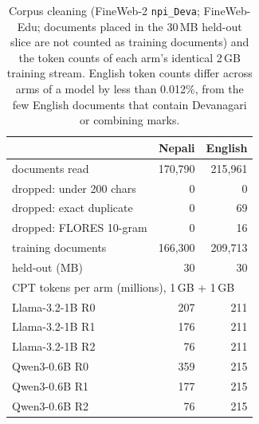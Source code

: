 \begin{table}[t]
\centering\small
\setlength{\tabcolsep}{3.5pt}
\begin{tabular}{lrr}
\toprule
& Nepali & English \\
\midrule
documents read & 170,790 & 215,961 \\
dropped: under 200 chars & 0 & 0 \\
dropped: exact duplicate & 0 & 69 \\
dropped: FLORES 10-gram & 0 & 16 \\
training documents & 166,300 & 209,713 \\
held-out (MB) & 30 & 30 \\
\midrule
\multicolumn{3}{l}{CPT tokens per arm (millions), 1\,GB + 1\,GB}\\
Llama-3.2-1B R0 & 207 & 211 \\
Llama-3.2-1B R1 & 176 & 211 \\
Llama-3.2-1B R2 & 76 & 211 \\
Qwen3-0.6B R0 & 359 & 215 \\
Qwen3-0.6B R1 & 177 & 215 \\
Qwen3-0.6B R2 & 76 & 215 \\
\bottomrule
\end{tabular}
\caption{Corpus cleaning (FineWeb-2 \texttt{npi\_Deva}; FineWeb-Edu; documents placed in the 30\,MB held-out slice are not counted as training documents) and the token counts of each arm's identical 2\,GB training stream. English token counts differ across arms of a model by less than 0.012\%, from the few English documents that contain Devanagari or combining marks.}
\label{tab:data}
\end{table}
